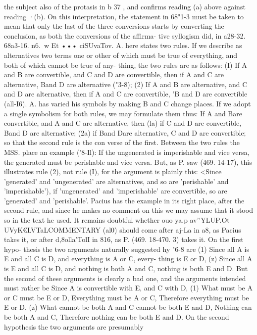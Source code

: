 {{{{{{{{{{{{the subject also of the protasis in b 37 , and confirms reading (a)
above against reading ·(b).
On this interpretation, the statement in 68"1-3 must be taken
to mean that only the last of the three conversions starts by
converting the conclusion, as both the conversions of the affirma-
tive syllogism did, in a28-32.
68a3-16. n6.~w Et ••• ciSUvaTov. A. here states two rules. If
we describe as alternatives two terms one or other of which must
be true of everything, and both of which cannot be true of any-
thing, the two rules are as follows: (I) If A and B are convertible,
and C and D are convertible, then if A and C are alternative,
Band D are alternative ("3-8); (2) If A and B are alternative,
and C and D are alternative, then if A and C are convertible,
'B and D are convertible (all-I6). A. has varied his symbols by
making B and C change places. If we adopt a single symbolism
for both rules, we may formulate them thus: If A and Bare
convertible, and A and C are alternative, then (la) if C and D
are convertible, Band D are alternative; (2a) if Band Dare
alternative, C and D are convertible; so that the second rule is
the con verse of the first.
Between the two rules the MSS. place an example ('8-Il):
If the ungenerated is imperishable and vice versa, the generated
must be perishable and vice versa. But, as P. saw (469. 14-17),
this illustrates rule (2), not rule (I), for the argument is plainly
this: <Since 'generated' and 'ungenerated' are alternatives, and
so are 'perishable' and 'imperishable'), if 'ungenerated' and
'imperishable' are convertible, so are 'generated' and 'perishable'.
Pacius has the example in its right place, after the second rule,
and since he makes no comment on this we may assume that it
stood so in the text he used.
It remains doubtful whether ouo ya.p av'\'\0YLUP.Ot UVyK€LVTaLCOMMENTARY
(al0) should come after aj-La in a8, as Pacius takes it, or after
d,8olla'TolI in 816, as P. (469. 18-470. 3) takes it. On the first hypo-
thesis the two arguments naturally suggested hy "6-8 are (1)
Since all A is E and all C is D, and everything is A or C, every-
thing is E or D, (z) Since all A is E and all C is D, and nothing
is both A and C, nothing is both E and D. But the second of
these arguments is clearly a bad one, and the arguments intended
must rather be Since A is convertible with E, and C with D,
(1) What must be A or C must be E or D, Everything must be
A or C, Therefore everything must be E or D, (z) What cannot
be both A and C cannot be both E and D, Nothing can be both
A and C, Therefore nothing can be both E and D.
On the second hypothesis the two arguments are presumably
}}}}}}}}}}}}
